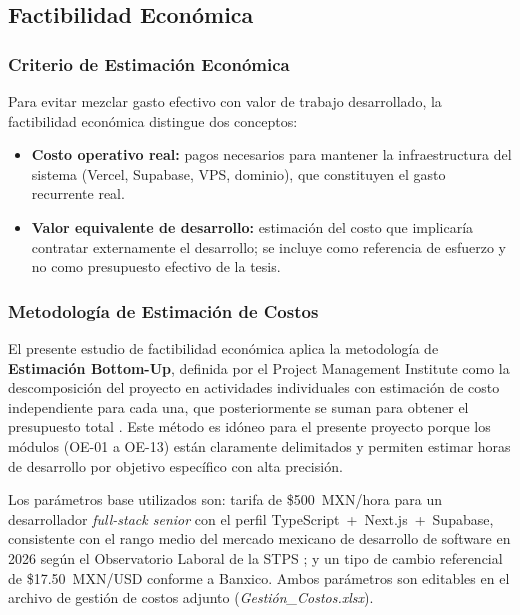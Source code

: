 \FloatBarrier
\subsection{Factibilidad Económica}

\subsubsection{Criterio de Estimaci\'on Econ\'omica}
Para evitar mezclar gasto efectivo con valor de trabajo desarrollado, la factibilidad
econ\'omica distingue dos conceptos:
\begin{itemize}
  \item \textbf{Costo operativo real:} pagos necesarios para mantener la infraestructura del sistema (Vercel, Supabase, VPS, dominio), que constituyen el gasto recurrente real.
  \item \textbf{Valor equivalente de desarrollo:} estimaci\'on del costo que implicar\'ia contratar externamente el desarrollo; se incluye como referencia de esfuerzo y no como presupuesto efectivo de la tesis.
\end{itemize}

\subsubsection{Metodología de Estimación de Costos}

El presente estudio de factibilidad econ\'omica aplica la metodolog\'ia de
\textbf{Estimaci\'on Bottom-Up}, definida por el Project Management Institute
como la descomposici\'on del proyecto en actividades individuales con estimaci\'on
de costo independiente para cada una, que posteriormente se suman para obtener
el presupuesto total \cite{stps_observatorio}. Este m\'etodo es id\'oneo para el presente proyecto
porque los m\'odulos (OE-01 a OE-13) est\'an claramente delimitados y permiten
estimar horas de desarrollo por objetivo espec\'ifico con alta precisi\'on.

Los par\'ametros base utilizados son: tarifa de \$500~MXN/hora para un desarrollador
\textit{full-stack senior} con el perfil TypeScript~+~Next.js~+~Supabase, consistente
con el rango medio del mercado mexicano de desarrollo de software en 2026 seg\'un
el Observatorio Laboral de la STPS \cite{stps_observatorio}; y un tipo de cambio referencial de
\$17.50~MXN/USD conforme a Banxico. Ambos par\'ametros son editables en el archivo
de gesti\'on de costos adjunto (\textit{Gesti\'on\_Costos.xlsx}).

